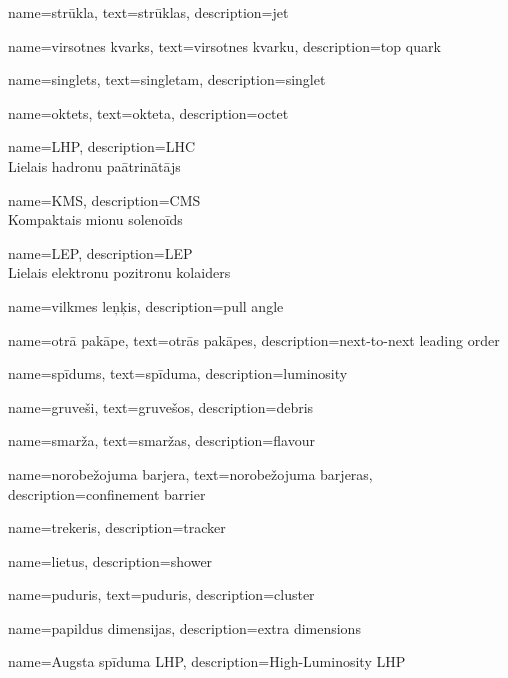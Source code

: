{
  name=strūkla,
  text=strūklas,
  description={jet}
}

{
  name=virsotnes kvarks,
  text=virsotnes kvarku,
  description={top quark}
}

{
  name=singlets,
  text=singletam,
  description={singlet}
}

{
  name=oktets,
  text=okteta,
  description={octet}
}

{
  name=LHP,
  description={LHC\\Lielais hadronu paātrinātājs}
}

{
  name=KMS,
  description={CMS\\Kompaktais mionu solenoīds}
}

{
  name=LEP,
  description={LEP\\Lielais elektronu pozitronu kolaiders}
}

{
  name=vilkmes leņķis,
  description={pull angle}
}

{
  name=otrā pakāpe,
  text=otrās pakāpes,
  description={next-to-next leading order}
}


{
  name=spīdums,
  text=spīduma,
  description={luminosity}
}

{
        name=gruveši,
        text=gruvešos,
        description={debris}
}

{
        name=smarža,
        text=smaržas,
        description={flavour}
}

{
        name=norobežojuma barjera,
        text=norobežojuma barjeras,
        description={confinement barrier}
}

{
        name=trekeris,
        description={tracker}
}

{
        name=lietus,
        description={shower}
}

{
        name=puduris,
        text=puduris,
        description={cluster}
}

{
        name=papildus dimensijas,
        description={extra dimensions}
}

{
        name=Augsta spīduma LHP,
        description={High-Luminosity LHP}
}

